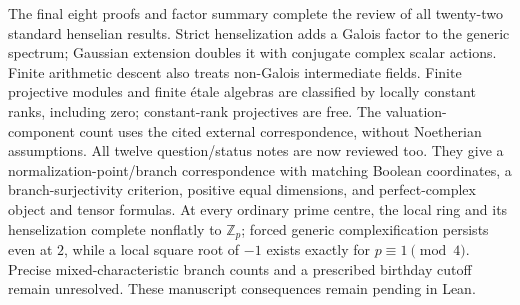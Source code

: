 \documentclass[11pt]{article}
\newcommand{\Z}{\mathbb{Z}}
\begin{document}
{The final eight proofs and factor summary complete the review of all
twenty-two standard henselian results. Strict henselization adds a Galois
factor to the generic spectrum; Gaussian extension doubles it with
conjugate complex scalar actions. Finite arithmetic descent also treats
non-Galois intermediate fields. Finite projective modules and finite
\'etale algebras are classified by locally constant ranks, including zero;
constant-rank projectives are free. The valuation-component count uses
the cited external correspondence, without Noetherian assumptions.
All twelve question/status notes are now reviewed too. They give a
normalization-point/branch correspondence with matching Boolean coordinates,
a branch-surjectivity criterion, positive equal dimensions, and
perfect-complex object and tensor formulas. At every ordinary prime centre,
the local ring and its henselization complete nonflatly to $\Z_p$;
forced generic complexification persists even at $2$, while a local square
root of $-1$ exists exactly for $p\equiv1\pmod4$. Precise mixed-characteristic
branch counts and a prescribed birthday cutoff remain unresolved.
These manuscript consequences remain pending in Lean.}
\end{document}

